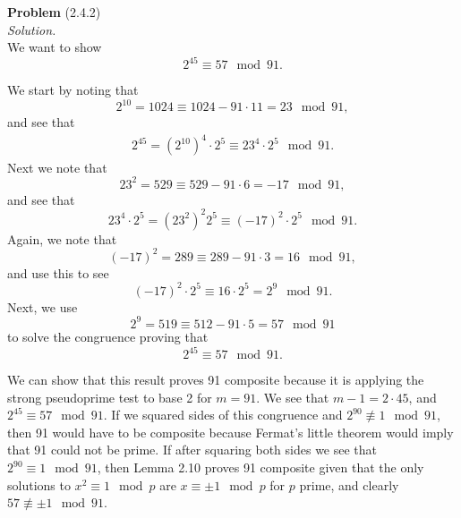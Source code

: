 \documentclass[12 pt]{amsart}
\begin{document}
\phantom{\quad} \vfill
\noindent
\textbf{Problem} (2.4.2) \\[4ex]
\emph{Solution.} \\[2ex]
  We want to show 
  \[
    2^{45} \equiv 57 \mod 91.
  \]

  We start by noting that 
  \[
    2^{10} = 1024 \equiv 1024 - 91 \cdot 11 = 23 \mod 91,
  \]
  and see that 
  \begin{align*}
    2^{45} = \left( 2^{10} \right)^4 \cdot 2^5 
           \equiv 23^4 \cdot 2^5 \mod 91.
  \end{align*}
  Next we note that 
  \[
    23^2 = 529 \equiv 529 - 91 \cdot 6 = -17 \mod 91,
  \]
  and see that
  \[
    23^4 \cdot 2^5 = \left( 23^2 \right)^2 2^5 
      \equiv (-17)^2 \cdot 2^5 \mod 91.
  \]
  Again, we note that
  \[
    (-17)^2 = 289 \equiv 289 - 91 \cdot 3 = 16 \mod 91,
  \]
  and use this to see
  \[
    (-17)^2 \cdot 2^5 \equiv 16 \cdot 2^5 = 2^9 \mod 91.
  \]
  Next, we use
  \[
    2^9 = 519 \equiv 512 - 91 \cdot 5 = 57 \mod 91
  \]
  to solve the congruence proving that
  \[
    2^{45} \equiv 57 \mod 91.
  \]

  We can show that this result proves 91 composite because
  it is applying the strong pseudoprime test to base 2
  for $m = 91$. 
  We see that $m - 1 = 2 \cdot 45$, and 
  $2^{45} \equiv 57 \mod 91$.
  If we squared sides of this congruence and 
  $2^{90} \not \equiv 1 \mod 91$, then 91 would have to be composite
  because Fermat's little theorem would imply that 91 could not 
  be prime. 
  If after squaring both sides we see that
  $2^{90} \equiv 1 \mod 91$, then Lemma 2.10 proves 91 composite
  given that the only solutions to $x^2 \equiv 1 \mod p$ are
  $x \equiv \pm 1 \mod p$ for $p$ prime, and clearly
  $57 \not \equiv \pm 1 \mod 91$.
\vfill
\newpage
\end{document}
